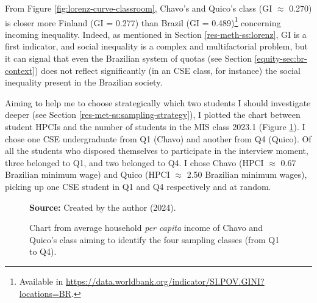 From Figure \ref{fig:lorenz-curve-classroom}, Chavo's and Quico's class (\acrfull{GI} $\approx$ 0.270) is closer more Finland (\gls{GI} = 0.277) than Brazil (\gls{GI} = 0.489)\footnote{Available in \url{https://data.worldbank.org/indicator/SI.POV.GINI?locations=BR}.} concerning incoming inequality. Indeed, as mentioned in Section \ref{res-meth-ss:lorenz}, \gls{GI} is a first indicator, and social inequality is a complex and multifactorial problem, but it can signal that even the Brazilian system of quotas (see Section \ref{equity-sec:br-context}) does not reflect significantly (in an \acrfull{CSE} class, for instance) the social inequality present in the Brazilian society.

Aiming to help me to choose strategically which two students I should investigate deeper (see Section \ref{res-met-ss:sampling-strategy}), I plotted the chart between student \acrfull{HPCI}s and the number of students in the \gls{MIS} class 2023.1 (Figure \ref{fig:sampling-classes-ds-sef}). I chose one \gls{CSE} undergraduate from \gls{Q}1 (Chavo) and another from \gls{Q}4 (Quico). Of all the students who disposed themselves to participate in the interview moment, three belonged to \gls{Q}1, and two belonged to \gls{Q}4. I chose Chavo (\gls{HPCI} $\approx$ 0.67 Brazilian minimum wage) and Quico (\gls{HPCI} $\approx$ 2.50 Brazilian minimum wages), picking up one \gls{CSE} student in \gls{Q}1 and \gls{Q}4 respectively and at random.

\begin{figure}[ht!]
\centering

\caption{\textmd{Chart from average household \textit{per capita} income of Chavo and Quico’s class aiming to identify the four sampling classes (from \acrshort{Q}1 to \acrshort{Q}4).}}
\label{fig:sampling-classes-ds-sef}

\par\medskip\ABNTEXfontereduzida\selectfont\textbf{Source:} Created by the author (2024).%
\end{figure}

